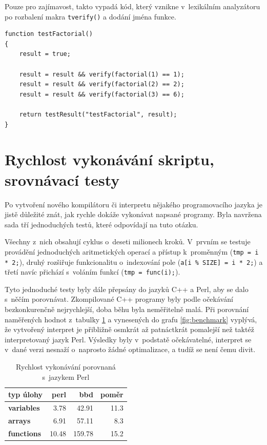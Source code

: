 \documentclass[11pt,twoside,a4paper]{book}
\begin{document}
Pouze pro zajímavost, takto vypadá kód, který vznikne v~lexikálním analyzátoru po rozbalení makra \texttt{tverify()} a dodání jména funkce.

\begin{verbatim}
function testFactorial()
{
    result = true;

    result = result && verify(factorial(1) == 1);
    result = result && verify(factorial(2) == 2);
    result = result && verify(factorial(3) == 6);

    return testResult("testFactorial", result);
}
\end{verbatim}


\section{Rychlost vykonávání skriptu, srovnávací testy}
\label{rychlost_vykonavani_skriptu_srovnavaci_testy}

Po vytvoření nového kompilátoru či interpretu nějakého programovacího jazyka je jistě dů\-le\-ži\-té znát, jak rychle dokáže vykonávat napsané programy. Byla navržena sada tří jednoduchých testů, které odpovídají na tuto otázku.

Všechny z~nich obsahují cyklus o~deseti milionech kroků. V~prvním se testuje provádění jednoduchých aritmetických operací a přístup k~proměnným (\texttt{tmp = i * 2;}), druhý rozšiřuje funkcionalitu o~indexování pole (\texttt{a[i \% SIZE] = i * 2;}) a třetí navíc přichází s~voláním funkcí (\texttt{tmp = func(i);}).

Tyto jednoduché testy byly dále přepsány do jazyků C++ a Perl, aby se dalo s~něčím porovnávat. Zkompilované C++ programy byly podle očekávání bezkonkurenčně nejrychlejší, doba běhu byla neměřitelně malá. Při porovnání naměřených hodnot z~tabulky \ref{tab:benchmark} a vynesených do grafu \ref{fig:benchmark} vyplývá, že vytvořený interpret je přibližně osmkrát až patnáctkrát pomalejší než taktéž interpretovaný jazyk Perl. Výsledky byly v~podstatě očekávatelné, interpret se v~dané verzi nesnaží o~naprosto žádné optimalizace, a tudíž se není čemu divit.

\begin{table}
\begin{center}
\begin{tabular}{|l||r|r||r|}
\hline
\textbf{typ úlohy} & \textbf{perl} & \textbf{bbd} & \textbf{poměr} \\
\hline \hline
\bf{variables} & 3.78 & 42.91 & 11.3 \\
\hline
\bf{arrays} & 6.91 & 57.11 & 8.3 \\
\hline
\bf{functions} & 10.48 & 159.78 & 15.2 \\
\hline
\end{tabular}
\end{center}
\caption{Rychlost vykonávání porovnaná s~jazykem Perl}
\label{tab:benchmark}
\end{table}
\end{document}
